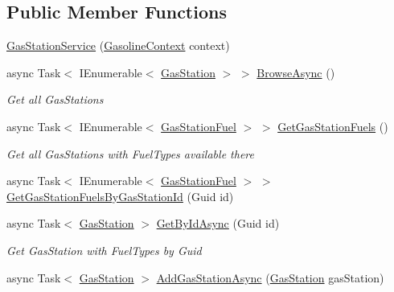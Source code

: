 \subsection*{Public Member Functions}
\begin{DoxyCompactItemize}
\item 
\mbox{\hyperlink{class_gasoline_1_1_data_1_1_services_1_1_gas_station_service_a11c6e9e391f1673e3d6f65b2ae9b7fe2}{Gas\+Station\+Service}} (\mbox{\hyperlink{class_gasoline_1_1_data_1_1_e_f_1_1_gasoline_context}{Gasoline\+Context}} context)
\item 
async Task$<$ I\+Enumerable$<$ \mbox{\hyperlink{class_gasoline_1_1_data_1_1_models_1_1_gas_station}{Gas\+Station}} $>$ $>$ \mbox{\hyperlink{class_gasoline_1_1_data_1_1_services_1_1_gas_station_service_adb5cc988c7237c4019008a3c86bbe25f}{Browse\+Async}} ()
\begin{DoxyCompactList}\small\item\em Get all Gas\+Stations \end{DoxyCompactList}\item 
async Task$<$ I\+Enumerable$<$ \mbox{\hyperlink{class_gasoline_1_1_data_1_1_models_1_1_gas_station_fuel}{Gas\+Station\+Fuel}} $>$ $>$ \mbox{\hyperlink{class_gasoline_1_1_data_1_1_services_1_1_gas_station_service_a1b190190220d302d763a55ce77e7de50}{Get\+Gas\+Station\+Fuels}} ()
\begin{DoxyCompactList}\small\item\em Get all Gas\+Stations with Fuel\+Types available there \end{DoxyCompactList}\item 
async Task$<$ I\+Enumerable$<$ \mbox{\hyperlink{class_gasoline_1_1_data_1_1_models_1_1_gas_station_fuel}{Gas\+Station\+Fuel}} $>$ $>$ \mbox{\hyperlink{class_gasoline_1_1_data_1_1_services_1_1_gas_station_service_a74d212652b5b4d79bae715b9e2ac8034}{Get\+Gas\+Station\+Fuels\+By\+Gas\+Station\+Id}} (Guid id)
\item 
async Task$<$ \mbox{\hyperlink{class_gasoline_1_1_data_1_1_models_1_1_gas_station}{Gas\+Station}} $>$ \mbox{\hyperlink{class_gasoline_1_1_data_1_1_services_1_1_gas_station_service_a27d422e0840d24e1a45682f4dd293b7b}{Get\+By\+Id\+Async}} (Guid id)
\begin{DoxyCompactList}\small\item\em Get Gas\+Station with Fuel\+Types by Guid \end{DoxyCompactList}\item 
async Task$<$ \mbox{\hyperlink{class_gasoline_1_1_data_1_1_models_1_1_gas_station}{Gas\+Station}} $>$ \mbox{\hyperlink{class_gasoline_1_1_data_1_1_services_1_1_gas_station_service_a54922c75e2b138c45dc94dbf0c0c5b29}{Add\+Gas\+Station\+Async}} (\mbox{\hyperlink{class_gasoline_1_1_data_1_1_models_1_1_gas_station}{Gas\+Station}} gas\+Station)

\end{DoxyCompactItemize}
